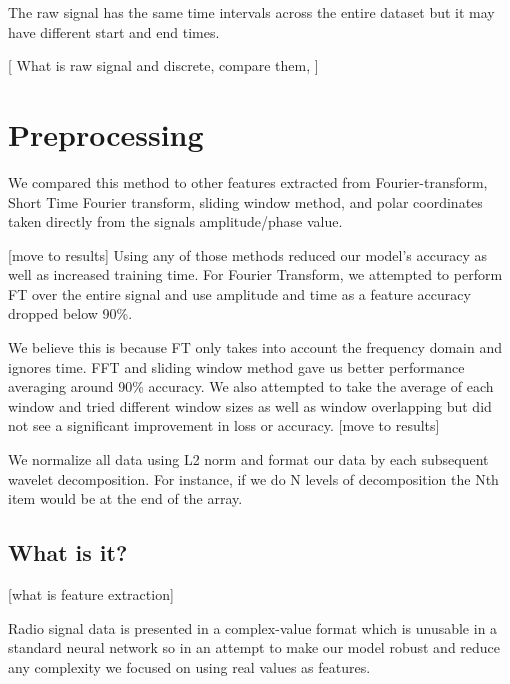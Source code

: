 \documentclass{turabian-thesis}
\begin{document}
The raw signal has the same time intervals across the entire dataset but it may have different start and end times. 


[ What is raw signal and discrete, compare them, ]

\chapter{Preprocessing}
We compared this method to other features extracted from Fourier-transform, Short Time Fourier transform, sliding window method, and polar coordinates taken directly from the signals amplitude/phase value. 


[move to results]
Using any of those methods reduced our model's accuracy as well as increased training time. For Fourier Transform, we attempted to perform FT over the entire signal and use amplitude and time as a feature accuracy dropped below 90\%. 


We believe this is because FT only takes into account the frequency domain and ignores time. FFT and sliding window method gave us better performance averaging around 90\% accuracy. We also attempted to take the average of each window and tried different window sizes as well as window overlapping but did not see a significant improvement in loss or accuracy.
[move to results]

We normalize all data using L2 norm and format our data by each subsequent wavelet decomposition. For instance, if we do N levels of decomposition the Nth item would be at the end of the array.

\section{What is it?}
[what is feature extraction]


Radio signal data is presented in a complex-value format which is unusable in a standard neural network so in an attempt to make our model robust and reduce any complexity we focused on using real values as features.


\end{document}
